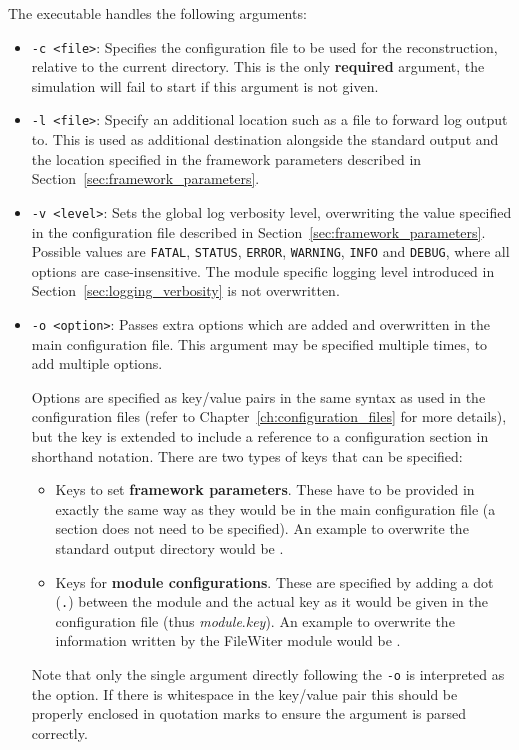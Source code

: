 The executable handles the following arguments:
\begin{itemize}
\item \texttt{-c <file>}: Specifies the configuration file to be used for the reconstruction, relative to the current directory.
This is the only \textbf{required} argument, the simulation will fail to start if this argument is not given.
\item \texttt{-l <file>}: Specify an additional location such as a file to forward log output to. This is used as additional destination alongside the standard output and the location specified in the framework parameters described in Section~\ref{sec:framework_parameters}.
\item \texttt{-v <level>}: Sets the global log verbosity level, overwriting the value specified in the configuration file described in Section~\ref{sec:framework_parameters}.
Possible values are \texttt{FATAL}, \texttt{STATUS}, \texttt{ERROR}, \texttt{WARNING}, \texttt{INFO} and \texttt{DEBUG}, where all options are case-insensitive.
The module specific logging level introduced in Section~\ref{sec:logging_verbosity} is not overwritten.
\item \texttt{-o <option>}: Passes extra options which are added and overwritten in the main configuration file.
This argument may be specified multiple times, to add multiple options.

Options are specified as key/value pairs in the same syntax as used in the configuration files (refer to Chapter~\ref{ch:configuration_files} for more details), but the key is extended to include a reference to a configuration section in shorthand notation.
There are two types of keys that can be specified:
\begin{itemize}
\item Keys to set \textbf{framework parameters}. These have to be provided in exactly the same way as they would be in the main configuration file (a section does not need to be specified). An example to overwrite the standard output directory would be .
\item Keys for \textbf{module configurations}. These are specified by adding a dot (\texttt{.}) between the module and the actual key as it would be given in the configuration file (thus \textit{module}.\textit{key}). An example to overwrite the information written by the FileWiter module would be .
\end{itemize}
Note that only the single argument directly following the \texttt{-o} is interpreted as the option. If there is whitespace in the key/value pair this should be properly enclosed in quotation marks to ensure the argument is parsed correctly.
\end{itemize}

